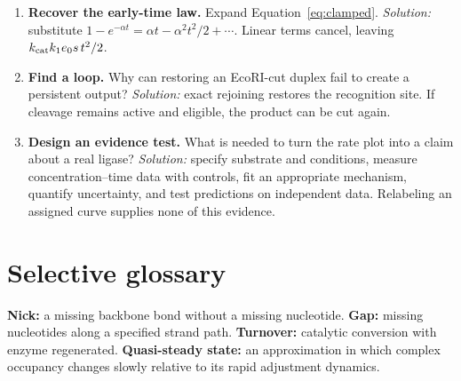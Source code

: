 \begin{enumerate}
\item \textbf{Recover the early-time law.} Expand Equation~\ref{eq:clamped}.
\emph{Solution:} substitute $1-e^{-\alpha t}=\alpha t-\alpha^2t^2/2+\cdots$. Linear terms cancel, leaving $k_{\rm cat}k_1e_0s\,t^2/2$.
\item \textbf{Find a loop.} Why can restoring an EcoRI-cut duplex fail to create a persistent output?
\emph{Solution:} exact rejoining restores the recognition site. If cleavage remains active and eligible, the product can be cut again.
\item \textbf{Design an evidence test.} What is needed to turn the rate plot into a claim about a real ligase?
\emph{Solution:} specify substrate and conditions, measure concentration--time data with controls, fit an appropriate mechanism, quantify uncertainty, and test predictions on independent data. Relabeling an assigned curve supplies none of this evidence.
\end{enumerate}

\section*{Selective glossary}
\textbf{Nick:} a missing backbone bond without a missing nucleotide.
\textbf{Gap:} missing nucleotides along a specified strand path.
\textbf{Turnover:} catalytic conversion with enzyme regenerated.
\textbf{Quasi-steady state:} an approximation in which complex occupancy changes slowly relative to its rapid adjustment dynamics.
